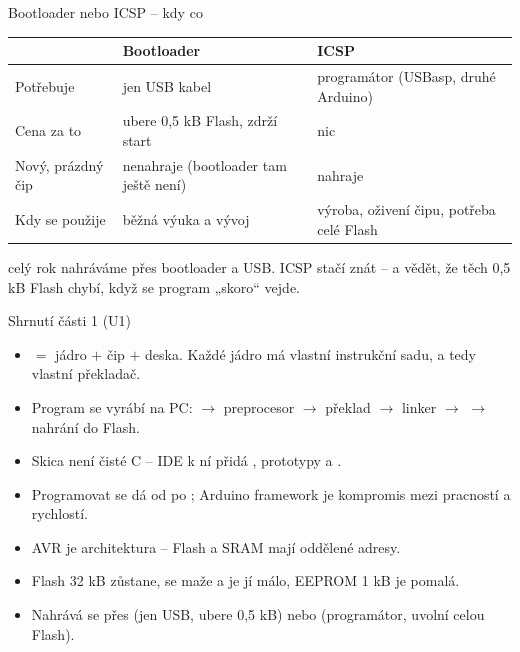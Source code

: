 \documentclass[12pt,aspectratio=169]{beamer}
\begin{document}
\begin{frame}{Bootloader nebo ICSP -- kdy co}
  \footnotesize
  \begin{tabular}{@{}p{2.2cm}p{4.0cm}p{4.2cm}@{}}
    \toprule
     & \textbf{Bootloader} & \textbf{ICSP} \\
    \midrule
    Potřebuje    & jen USB kabel & programátor (USBasp, druhé Arduino) \\
    \addlinespace
    Cena za to   & ubere 0,5 kB Flash, zdrží start & nic \\
    \addlinespace
    Nový, prázdný čip & nenahraje (bootloader tam ještě není) & nahraje \\
    \addlinespace
    Kdy se použije & běžná výuka a vývoj & výroba, oživení čipu, potřeba celé Flash \\
    \bottomrule
  \end{tabular}
  \vspace{3mm}

  \small
   celý rok nahráváme přes bootloader a USB.
  ICSP stačí znát -- a vědět, že těch 0,5 kB Flash chybí, když se program
  „skoro`` vejde.
\end{frame}

\begin{keyframe}{Shrnutí části 1 (U1)}
  \footnotesize
  \begin{itemize}\itemsep2pt
    \item {} $=$ jádro $+$ čip $+$ deska. Každé jádro má vlastní
          instrukční sadu, a tedy vlastní překladač.
    \item Program se vyrábí  na PC:
           $\to$ preprocesor $\to$ překlad $\to$ linker $\to$ 
          $\to$ nahrání do Flash.
    \item Skica  není čisté C -- IDE k ní přidá ,
          prototypy a .
    \item Programovat se dá od  po ; Arduino
          framework je kompromis mezi pracností a rychlostí.
    \item AVR je  architektura -- Flash a SRAM mají oddělené adresy.
    \item Flash 32 kB zůstane,  se maže a je jí málo,
          EEPROM 1 kB je pomalá.
    \item Nahrává se přes  (jen USB, ubere 0,5 kB) nebo
           (programátor, uvolní celou Flash).
  \end{itemize}
\end{keyframe}
\end{document}
